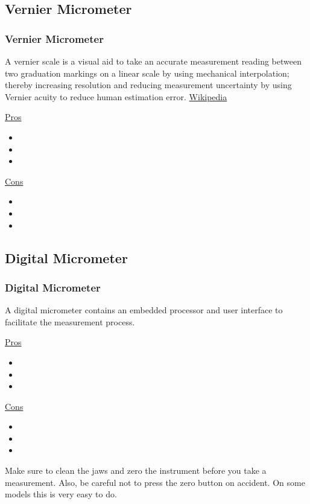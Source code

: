 \documentclass[fleqn]{beamer} %
\newcommand{\sectionIIsubsectionIIItitle}{Vernier Micrometer}
\newcommand{\sectionIIsubsectionIVtitle}{Digital Micrometer}
\begin{document}
		\subsection{\sectionIIsubsectionIIItitle}\label{sectionIIsubsectionIII}

			\begin{frame}
				\frametitle{\sectionIIsubsectionIIItitle}

				A vernier scale is a visual aid to take an accurate measurement reading between two graduation markings on a linear scale by using mechanical interpolation; thereby increasing resolution and reducing measurement uncertainty by using Vernier acuity to reduce human estimation error.  {\tiny \href{https://en.wikipedia.org/wiki/Vernier_scale}{Wikipedia}}

				\begin{multicols}{2}
				\underline{Pros}
				\begin{itemize}
				\item 
				\item
				\item
				\end{itemize}
				\underline{Cons}
				\begin{itemize}
				\item 
				\item
				\item
				\end{itemize}
				\end{multicols}

			\end{frame}

		\subsection{\sectionIIsubsectionIVtitle}\label{sectionIIsubsectionIV}

			\begin{frame}
				\frametitle{\sectionIIsubsectionIVtitle}
				A digital micrometer contains an embedded processor and user interface to facilitate the measurement process.

				\begin{multicols}{2}
				\underline{Pros}
				\begin{itemize}
				\item 
				\item
				\item
				\end{itemize}
				\underline{Cons}
				\begin{itemize}
				\item 
				\item
				\item
				\end{itemize}
				\end{multicols}
		

				Make sure to clean the jaws and zero the instrument before you take a measurement. Also, be careful not to press the zero button on accident. On some models this is very easy to do. \vspace{40mm}\\

			\end{frame}
\end{document}
